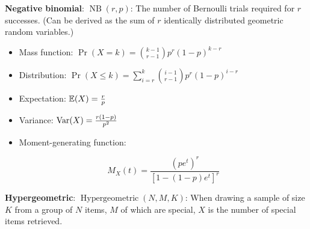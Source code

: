 \textbf{Negative binomial}: \( \operatorname{NB}(r, p)\): The number of Bernoulli trials required for \(r\) successes. (Can be derived as the sum of \(r\) identically distributed geometric random variables.)

\begin{itemize}

\item Mass function: \(\Pr(X = k) =  \binom{k-1}{r-1} p^r (1-p)^{k-r}\)

\item Distribution: \(\Pr(X \leq k) = \sum_{i=r}^k \binom{i-1}{r-1} p^r (1-p)^{i-r} \)

\item Expectation: \(\E(X) = \frac{r}{p}\)

\item Variance: \(\Var(X) =  \frac{r(1-p)}{p^2}\)

\item Moment-generating function: 

\[
M_X(t) = \frac{(pe^t)^r}{[1 - (1-p)e^t]^r}
\]

\end{itemize}


\textbf{Hypergeometric}: \( \operatorname{Hypergeometric}(N, M, K)\): When drawing a sample of size \(K\) from a group of \(N\) items, \(M\) of which are special, \(X\) is the number of special items retrieved.

